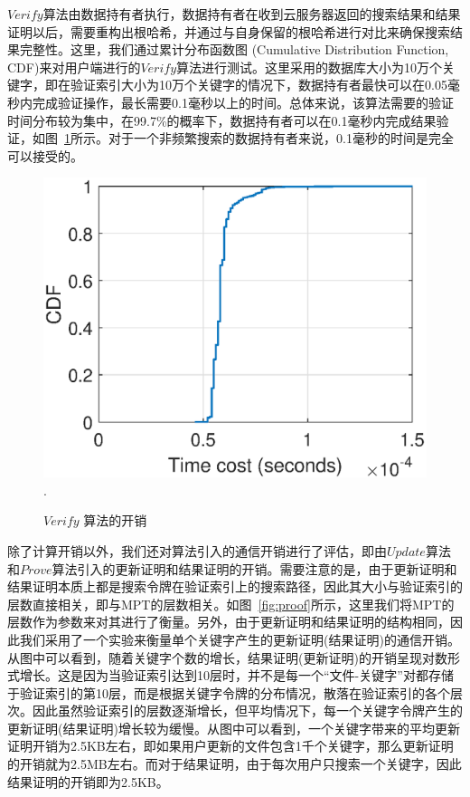 $Verify$算法由数据持有者执行，数据持有者在收到云服务器返回的搜索结果和结果证明以后，需要重构出根哈希，并通过与自身保留的根哈希进行对比来确保搜索结果完整性。这里，我们通过累计分布函数图 (Cumulative Distribution Function, CDF)来对用户端进行的$Verify$算法进行测试。这里采用的数据库大小为10万个关键字，即在验证索引大小为10万个关键字的情况下，数据持有者最快可以在0.05毫秒内完成验证操作，最长需要0.1毫秒以上的时间。总体来说，该算法需要的验证时间分布较为集中，在99.7\%的概率下，数据持有者可以在0.1毫秒内完成结果验证，如图~\ref{fig:verify}所示。对于一个非频繁搜索的数据持有者来说，0.1毫秒的时间是完全可以接受的。
\begin{figure}[h]
\centering
\includegraphics[width=3.5 in]{expr/verify}
\DeclareGraphicsExtensions.
\caption{$Verify$ 算法的开销}
\label{fig:verify}
\end{figure}

除了计算开销以外，我们还对算法引入的通信开销进行了评估，即由$Update$算法和$Prove$算法引入的更新证明和结果证明的开销。需要注意的是，由于更新证明和结果证明本质上都是搜索令牌在验证索引上的搜索路径，因此其大小与验证索引的层数直接相关，即与MPT的层数相关。如图~\ref{fig:proof}所示，这里我们将MPT的层数作为参数来对其进行了衡量。另外，由于更新证明和结果证明的结构相同，因此我们采用了一个实验来衡量单个关键字产生的更新证明(结果证明)的通信开销。从图中可以看到，随着关键字个数的增长，结果证明(更新证明)的开销呈现对数形式增长。这是因为当验证索引达到10层时，并不是每一个“文件-关键字”对都存储于验证索引的第10层，而是根据关键字令牌的分布情况，散落在验证索引的各个层次。因此虽然验证索引的层数逐渐增长，但平均情况下，每一个关键字令牌产生的更新证明(结果证明)增长较为缓慢。从图中可以看到，一个关键字带来的平均更新证明开销为2.5KB左右，即如果用户更新的文件包含1千个关键字，那么更新证明的开销就为2.5MB左右。而对于结果证明，由于每次用户只搜索一个关键字，因此结果证明的开销即为2.5KB。

